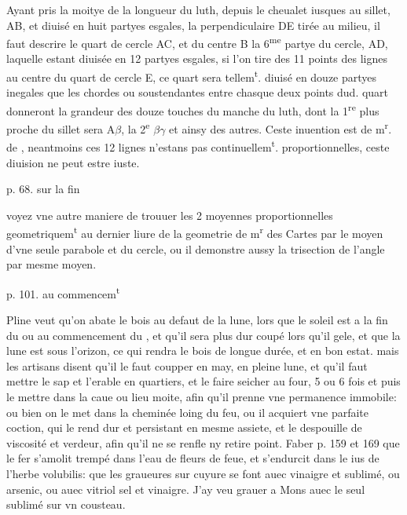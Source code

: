 \documentclass[11pt,a4paper]{article}
\begin{document}
Ayant pris la moitye de la longueur du luth, depuis le cheualet iusques au sillet, AB, et diuisé en huit partyes esgales, la perpendiculaire DE tirée au milieu, il faut descrire le quart de cercle AC, et du centre B la 6\textsuperscript{me} partye du cercle, AD, laquelle estant diuisée en 12 partyes esgales, si l'on tire des 11 points des lignes au centre du quart de cercle E, ce quart  sera tellem\textsuperscript{t}. diuisé en douze partyes inegales que les chordes ou soustendantes entre chasque deux points dud. quart donneront la grandeur des douze touches du manche du luth, dont la 1\textsuperscript{re} plus proche du sillet sera A$\beta$, la 2\textsuperscript{e} $\beta\gamma$ et ainsy des autres. Ceste inuention est de m\textsuperscript{r}. de , neantmoins ces 12 lignes n'estans pas continuellem\textsuperscript{t}. proportionnelles, ceste diuision ne peut estre iuste.

p. 68. sur la fin

voyez vne autre maniere de trouuer les 2 moyennes proportionnelles geometriquem\textsuperscript{t} au dernier liure de la geometrie de m\textsuperscript{r} des Cartes par le moyen d'vne seule parabole et du cercle, ou il demonstre aussy la trisection de l'angle par mesme moyen.


p. 101. au commencem\textsuperscript{t}

Pline veut qu'on abate le bois au defaut de la lune, lors que le soleil est a la fin du \ill{} ou au commencement du \ill{}, et qu'il sera plus dur coupé lors qu'il gele, et que la lune est sous l'orizon, ce qui rendra le bois de longue durée, et en bon estat. mais les artisans disent qu'il le faut coupper en may, en pleine lune, et qu'il faut mettre le sap et l'erable en quartiers, et le faire seicher au four, 5 ou 6 fois et puis le mettre dans la caue ou lieu moite, afin qu'il prenne vne permanence immobile: ou bien on le met dans la cheminée loing du feu, ou il acquiert vne parfaite coction, qui le rend dur et persistant en mesme assiete, et le despouille de viscosité et verdeur, afin qu'il ne se renfle ny retire point. Faber p. 159 et 169 que le fer s'amolit trempé dans l'eau de fleurs de feue, et s'endurcit dans le ius de l'herbe volubilis: que les graueures sur cuyure se font auec vinaigre \ill{} et sublimé, ou arsenic, ou auec vitriol sel et vinaigre. J'ay veu grauer a Mons auec le seul sublimé sur vn cousteau.
\end{document}
